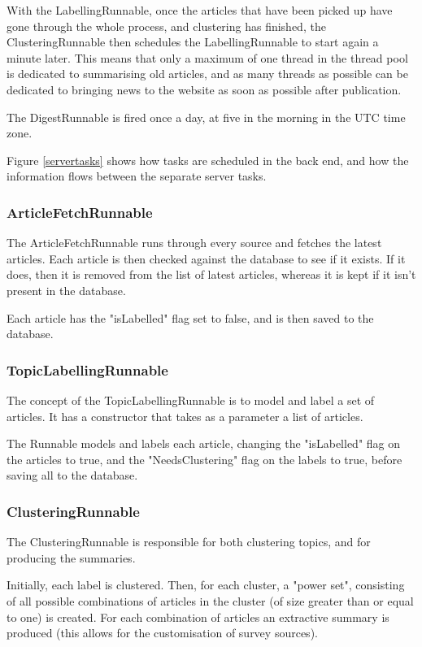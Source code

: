 \documentclass[12pt]{article}
\begin{document}
With the LabellingRunnable, once the articles that have been picked up have gone through the whole process, and clustering has finished, the ClusteringRunnable then schedules the LabellingRunnable to start again a minute later. This means that only a maximum of one thread in the thread pool is dedicated to summarising old articles, and as many threads as possible can be dedicated to bringing news to the website as soon as possible after publication.

The DigestRunnable is fired once a day, at five in the morning in the UTC time zone.

Figure \ref{servertasks} shows how tasks are scheduled in the back end, and how the information flows between the separate server tasks.

\subsubsection{ArticleFetchRunnable}

The ArticleFetchRunnable runs through every source and fetches the latest articles. Each article is then checked against the database to see if it exists. If it does, then it is removed from the list of latest articles, whereas it is kept if it isn't present in the database.

Each article has the "isLabelled" flag set to false, and is then saved to the database.

\subsubsection{TopicLabellingRunnable}

The concept of the TopicLabellingRunnable is to model and label a set of articles. It has a constructor that takes as a parameter a list of articles. 

The Runnable models and labels each article, changing the "isLabelled" flag on the articles to true, and the "NeedsClustering" flag on the labels to true, before saving all to the database. 

\subsubsection{ClusteringRunnable}

The ClusteringRunnable is responsible for both clustering topics, and for producing the summaries. 

Initially, each label is clustered. Then, for each cluster, a "power set", consisting of all possible combinations of articles in the cluster (of size greater than or equal to one) is created. For each combination of articles an extractive summary is produced (this allows for the customisation of survey sources). 
\end{document}
